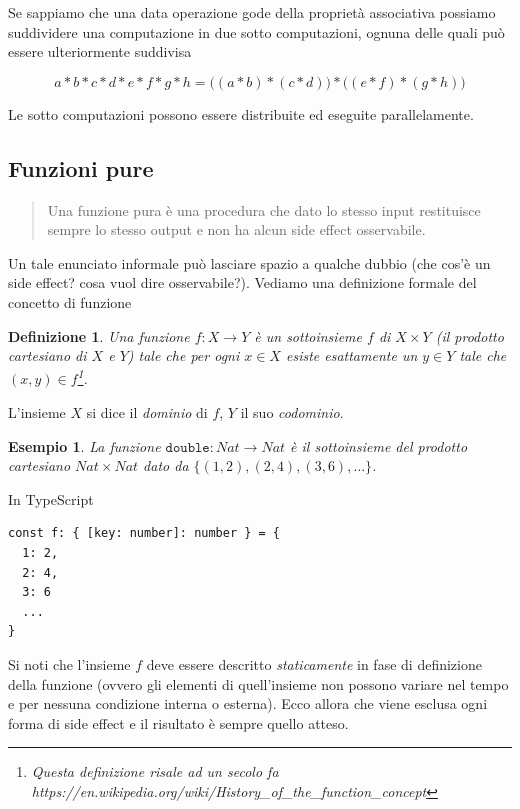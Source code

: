 \documentclass[12pt]{article}
\newtheorem{definition}{Definizione}
\newtheorem{example}{Esempio}
\begin{document}
Se sappiamo che una data operazione gode della proprietà associativa possiamo suddividere una computazione in due sotto computazioni, ognuna delle quali può essere ulteriormente suddivisa

$$
a * b * c * d * e * f * g * h = \Big( ( a * b ) * ( c * d ) \Big) * \Big( ( e * f ) * ( g * h ) \Big)
$$

Le sotto computazioni possono essere distribuite ed eseguite parallelamente.

\subsection{Funzioni pure}

\begin{quote}
Una funzione pura è una procedura che dato lo stesso input restituisce sempre lo stesso output e non ha alcun side effect osservabile.
\end{quote}

Un tale enunciato informale può lasciare spazio a qualche dubbio (che cos'è un side effect? cosa vuol dire osservabile?).
Vediamo una definizione formale del concetto di funzione

\begin{definition}
Una \emph{funzione} $f: X \rightarrow Y$ è un sottoinsieme $f$ di $X \times Y$ (il \emph{prodotto cartesiano} di $X$ e $Y$) tale che
per ogni $x \in X$ esiste esattamente un $y \in Y$ tale che $(x, y) \in f$\footnote{Questa definizione risale ad un secolo fa https://en.wikipedia.org/wiki/History\_of\_the\_function\_concept}.
\end{definition}

L'insieme $X$ si dice il \emph{dominio} di $f$, $Y$ il suo \emph{codominio}.

\begin{example}
La funzione $\texttt{double}: Nat \rightarrow Nat$ è il sottoinsieme del prodotto cartesiano $Nat \times Nat$ dato da $\{ (1, 2), (2, 4), (3, 6), \ldots \}$.
\end{example}

In TypeScript
\begin{verbatim}
const f: { [key: number]: number } = {
  1: 2,
  2: 4,
  3: 6
  ...
}
\end{verbatim}

Si noti che l'insieme $f$ deve essere descritto \emph{staticamente} in fase di definizione della funzione
(ovvero gli elementi di quell'insieme non possono variare nel tempo e per nessuna condizione interna o esterna).
Ecco allora che viene esclusa ogni forma di side effect e il risultato è sempre quello atteso.
\end{document}
